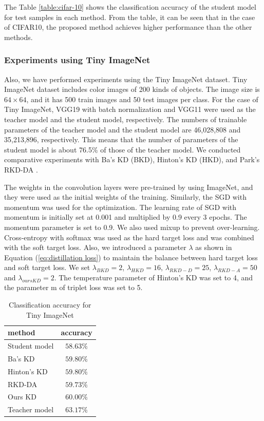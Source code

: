 \documentclass[a4paper,12pt]{article}
\begin{document}
The Table \ref{table:cifar-10} shows the classification accuracy of the student model for test samples in each method.
From the table, it can be seen that in the case of CIFAR10, the proposed method achieves higher performance than the other methods.


\subsubsection{Experiments using Tiny ImageNet}

Also, we have performed experiments using the Tiny ImageNet dataset.
Tiny ImageNet dataset includes color images of 200 kinds of objects.
The image size is $64 \times 64$, and it has 500 train images and 50 test images per class.
For the case of Tiny ImageNet, VGG19 with batch normalization and VGG11 were used as the teacher model and the student model, respectively.
The numbers of trainable parameters of the teacher model and the student model are 46,028,808 and 35,213,896, respectively.
This means that the number of parameters of the student model is about 76.5$\%$ of those of the teacher model.
We conducted comparative experiments with Ba's KD \cite{Ba2014} (BKD), Hinton's KD \cite{Hinton2015} (HKD), and Park's RKD-DA \cite{Park2019}.


The weights in the convolution layers were pre-trained by using ImageNet, and they were used as the initial weights of the training.
Similarly, the SGD with momentum was used for the optimization.
The learning  rate  of  SGD  with momentum is initially set at 0.001 and multiplied by 0.9  every 3 epochs.  
The  momentum parameter  is  set  to  0.9. 
We also used mixup \cite{Zhang2017} to prevent over-learning.
 Cross-entropy with softmax was used as the hard target loss and was combined with the soft target loss.
Also, we introduced a parameter $\lambda$ as shown in Equation (\ref{eq:distillation loss}) to maintain the balance between hard target loss and soft target loss.
We set $\lambda_{BKD}=2$, $\lambda_{HKD}=16$, $\lambda_{RKD-D}=25$, $\lambda_{RKD-A}=50$ and $\lambda_{oursKD}=2$.
The temperature parameter of Hinton's KD \cite{Hinton2015} was set to 4, and the parameter m of triplet loss was set to 5.


\begin{table}[ht]
\caption{Classification accuracy for Tiny ImageNet}
\label{table:imagenet}
\begin{center}
\begin{tabular}{|l|c|}
\hline
method & accuracy \\ \hline \hline
Student model & $58.63\%$ \\ \hline
Ba's KD & $59.80\%$ \\ \hline
Hinton's KD & $59.80\%$ \\ \hline
RKD-DA & $59.73\%$     \\ \hline
Ours KD & $\bm{60.00}\%$ \\ \hline \hline
Teacher model  & $63.17\%$    \\
\hline
\end{tabular}
\end{center}
\end{table}
\end{document}
